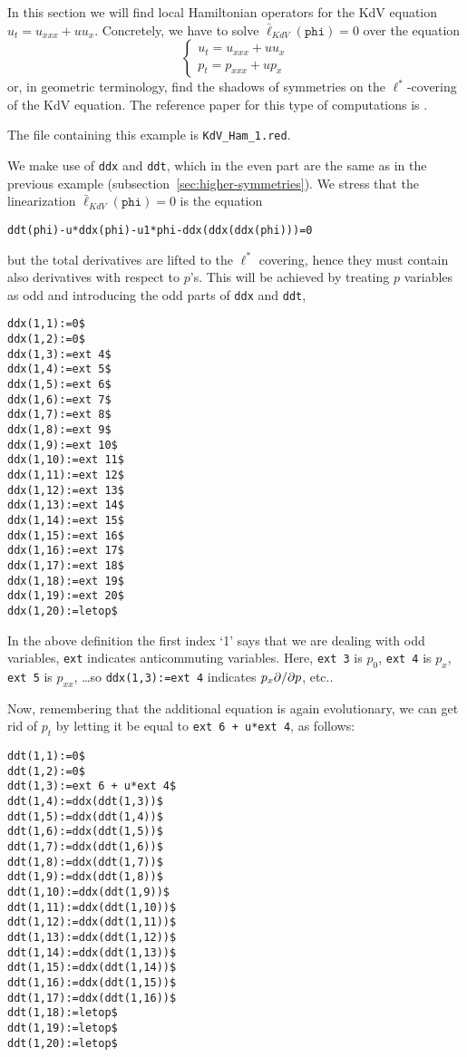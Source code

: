 In this section we will find local Hamiltonian operators for the KdV equation
$u_t=u_{xxx}+uu_x$. Concretely, we have to solve $\bar
\ell_{KdV}(\mathtt{phi})=0$ over the equation
\begin{displaymath}
  \left\{\begin{array}{l}
    u_t=u_{xxx}+uu_x\\
    p_t=p_{xxx}+up_x
  \end{array}\right.
\end{displaymath}
or, in geometric terminology, find the shadows of symmetries on the
$\ell^*$-covering of the KdV equation. The reference paper for this type of
computations is \cite{KKV}.

The file containing this example is \texttt{KdV\_Ham\_1.red}.

We make use of \texttt{ddx} and \texttt{ddt}, which in the even part are the
same as in the previous example (subsection~\ref{sec:higher-symmetries}).  We
stress that the linearization $\bar \ell_{KdV}(\mathtt{phi})=0$ is the equation
\begin{verbatim}
ddt(phi)-u*ddx(phi)-u1*phi-ddx(ddx(ddx(phi)))=0
\end{verbatim}
but the total derivatives are lifted to the $\ell^*$ covering, hence they must
contain also derivatives with respect to $p$'s. This will be achieved by
treating $p$ variables as odd and introducing the odd parts of \texttt{ddx} and
\texttt{ddt},
\begin{verbatim}
ddx(1,1):=0$
ddx(1,2):=0$
ddx(1,3):=ext 4$
ddx(1,4):=ext 5$
ddx(1,5):=ext 6$
ddx(1,6):=ext 7$
ddx(1,7):=ext 8$
ddx(1,8):=ext 9$
ddx(1,9):=ext 10$
ddx(1,10):=ext 11$
ddx(1,11):=ext 12$
ddx(1,12):=ext 13$
ddx(1,13):=ext 14$
ddx(1,14):=ext 15$
ddx(1,15):=ext 16$
ddx(1,16):=ext 17$
ddx(1,17):=ext 18$
ddx(1,18):=ext 19$
ddx(1,19):=ext 20$
ddx(1,20):=letop$
\end{verbatim}
In the above definition the first index `1' says that we are dealing with odd
variables, \texttt{ext} indicates anticommuting variables. Here, \texttt{ext 3}
is $p_0$, \texttt{ext 4} is $p_x$, \texttt{ext 5} is $p_{xx}$, \dots so
\texttt{ddx(1,3):=ext 4} indicates $p_x\pd{}{p}$, etc..

Now, remembering that the additional equation is again evolutionary, we can get
rid of $p_t$ by letting it be equal to \texttt{ext 6 + u*ext 4}, as follows:
\begin{verbatim}
ddt(1,1):=0$
ddt(1,2):=0$
ddt(1,3):=ext 6 + u*ext 4$
ddt(1,4):=ddx(ddt(1,3))$
ddt(1,5):=ddx(ddt(1,4))$
ddt(1,6):=ddx(ddt(1,5))$
ddt(1,7):=ddx(ddt(1,6))$
ddt(1,8):=ddx(ddt(1,7))$
ddt(1,9):=ddx(ddt(1,8))$
ddt(1,10):=ddx(ddt(1,9))$
ddt(1,11):=ddx(ddt(1,10))$
ddt(1,12):=ddx(ddt(1,11))$
ddt(1,13):=ddx(ddt(1,12))$
ddt(1,14):=ddx(ddt(1,13))$
ddt(1,15):=ddx(ddt(1,14))$
ddt(1,16):=ddx(ddt(1,15))$
ddt(1,17):=ddx(ddt(1,16))$
ddt(1,18):=letop$
ddt(1,19):=letop$
ddt(1,20):=letop$
\end{verbatim}

